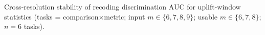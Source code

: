 Cross-resolution stability of recoding discrimination AUC for uplift-window statistics (tasks = comparison$\times$metric; input $m\in\{6,7,8,9\}$; usable $m\in\{6,7,8\}$; $n=6$ tasks).
